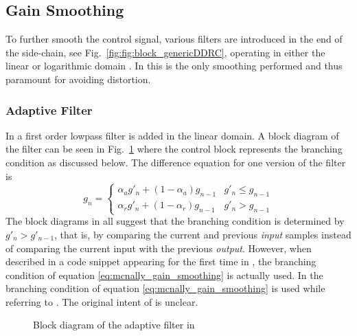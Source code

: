 \documentclass[../main2.tex]{subfiles}
\providecommand{\rootdir}{..}
\begin{document}
\FloatBarrier
\subsection{Gain Smoothing}
To further smooth the control signal, various filters are introduced in the end of the side-chain, see Fig.~\ref{fig:fig:block_genericDDRC}, operating in either the linear or logarithmic domain \cite{mcnally1984dynamic}\cite{frindle1996implementation}. In \cite{reiss2012tutorial} this is the only smoothing performed and thus paramount for avoiding distortion.
\subsubsection{Adaptive Filter} \label{adaptive_filter}
In \cite{mcnally1984} a first order lowpass filter is added in the linear domain. A block diagram of the filter can be seen in Fig.~\ref{fig:block_mcnally_theory_adap_filter} where the control block represents the branching condition as discussed below. The difference equation for one version of the filter is
\begin{equation}\label{eq:mcnally_gain_smoothing}
g_n = \begin{cases}
    \alpha_{a} g'_n + (1-\alpha_{a}) g_{n-1} 	& g'_n \leq g_{n-1} \\
    \alpha_{r} g'_n + (1-\alpha_{r}) g_{n-1} 		& g'_n > g_{n-1}
\end{cases}
\end{equation}
The block diagrams in \cite{mcnally1984dynamic}\cite{dafx02}\cite{dafx11}\cite{zolzer1997digital}\cite{zolzer2008digital} all suggest that the branching condition is determined by $g'_n > g'_{n-1}$, that is, by comparing the current and previous \emph{input} samples instead of comparing the current input with the previous \emph{output}. However, when described in a code snippet appearing for the first time in \cite{dafx11}, the branching condition of equation \eqref{eq:mcnally_gain_smoothing} is actually used. In \cite{bitzer2006parameter} the branching condition of equation \eqref{eq:mcnally_gain_smoothing} is used while referring to \cite{mcnally1984dynamic}\cite{dafx02}. The original intent of \cite{mcnally1984dynamic} is unclear.

\begin{figure}
\centerline{}
\caption{Block diagram of the adaptive filter in \cite{mcnally1984dynamic}}
\label{fig:block_mcnally_theory_adap_filter}
\end{figure}
\end{document}
